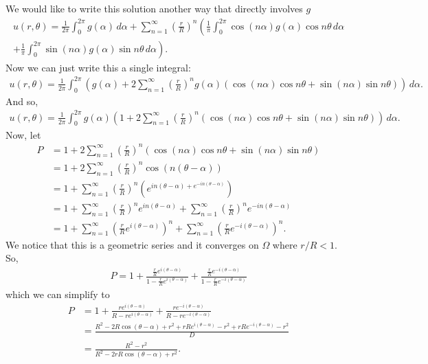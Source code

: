 \documentclass{article}
\theoremstyle{definition}
\newcommand{\f}[2]{\frac{#1}{#2}}
\newcommand{\lp}{\left(}
\newcommand{\rp}{\right)}
\begin{document}
We would like to write this solution another way that directly involves $g$
\begin{align*}
u(r,\theta) = \f{1}{2\pi}\int^{2\pi}_0 g(\alpha)\,d\alpha + \sum^\infty_{n=1}\left(\f{r}{R}\right)^n\left(\f{1}{\pi}\int^{2\pi}_0 \cos(n\alpha)g(\alpha)\cos n\theta\,d\alpha \right.\\\left. + \f{1}{\pi}\int^{2\pi}_0 \sin(n\alpha)g(\alpha)\sin n\theta\,d\alpha \right).
\end{align*}
Now we can just write this a single integral:
\begin{align*}
u(r,\theta) = \f{1}{2\pi}\int^{2\pi}_0 \left( g(\alpha) + 2\sum^\infty_{n=1}\left(\f{r}{R}\right)^n g(\alpha)\left( \cos(n\alpha)\cos n\theta + \sin(n\alpha)\sin n\theta\right)\right)\,d\alpha.
\end{align*}
And so,
\begin{align*}
u(r,\theta) = \f{1}{2\pi}\int^{2\pi}_0 g(\alpha)\left( 1 + 2\sum^\infty_{n=1}\left(\f{r}{R}\right)^n \left( \cos(n\alpha)\cos n\theta + \sin(n\alpha)\sin n\theta\right)\right)\,d\alpha .
\end{align*}
Now, let
\begin{align*}
P &= 1 + 2\sum^\infty_{n=1}\left(\f{r}{R}\right)^n \left( \cos(n\alpha)\cos n\theta + \sin(n\alpha)\sin n\theta\right)\\
&= 1 + 2\sum^\infty_{n=1}\left(\f{r}{R}\right)^n \cos(n(\theta-\alpha))\\
&= 1 + \sum^\infty_{n=1}\left(\f{r}{R}\right)^n \lp e^{in(\theta-\alpha) + e^{-in(\theta-\alpha)}} \rp\\
&= 1 + \sum^\infty_{n=1}\left(\f{r}{R}\right)^n e^{in(\theta-\alpha)} + \sum^\infty_{n=1}\left(\f{r}{R}\right)^n e^{-in(\theta-\alpha)}\\
&= 1 + \sum^\infty_{n=1} \lp \f{r}{R}e^{i(\theta-\alpha)} \rp^n + \sum^\infty_{n=1} \lp \f{r}{R}e^{-i(\theta-\alpha)} \rp^n.
\end{align*}
We notice that this is a geometric series and it converges on $\Omega$ where $r/R < 1$. So,
\begin{align*}
P = 1 + \f{\f{r}{R}e^{i(\theta-\alpha)}}{1 - \f{r}{R}e^{i(\theta-\alpha)}} + \f{\f{r}{R}e^{-i(\theta-\alpha)}}{1-\f{r}{R}e^{-i(\theta-\alpha)}}
\end{align*}
which we can simplify to
\begin{align*}
P 
&= 1 + \f{re^{i(\theta-\alpha)}}{R - re^{i(\theta-\alpha)}} + \f{re^{-i(\theta-\alpha)}}{R-re^{-i(\theta-\alpha)}}\\
&= \f{R^2 - 2R\cos(\theta-\alpha) + r^2 + rRe^{i(\theta-\alpha)} -r^2 + rRe^{-i(\theta-\alpha)} - r^2 }{D}  \\
&= \f{R^2 - r^2}{R^2 - 2rR\cos(\theta-\alpha) + r^2}.
\end{align*}
\end{document}
